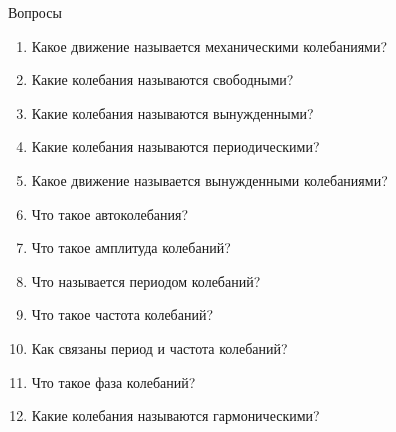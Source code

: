 \documentclass[a6paper, 11pt]{diss_4}
\renewcommand{\'}{\,'}
\begin{document}
\begin{center}
   Вопросы
\end{center}
\begin{enumerate}

\item Какое движение называется механическими колебаниями?
\item Какие колебания называются свободными?
\item Какие колебания называются вынужденными?
\item Какие колебания называются периодическими?
\item Какое движение называется вынужденными колебаниями?
\item Что такое автоколебания?
\item Что такое амплитуда колебаний?
\item Что называется периодом колебаний?
\item Что такое частота колебаний?
\item Как связаны период и частота колебаний?
\item Что такое фаза колебаний?
\item Какие колебания называются гармоническими?

\end{enumerate}
\end{document}
